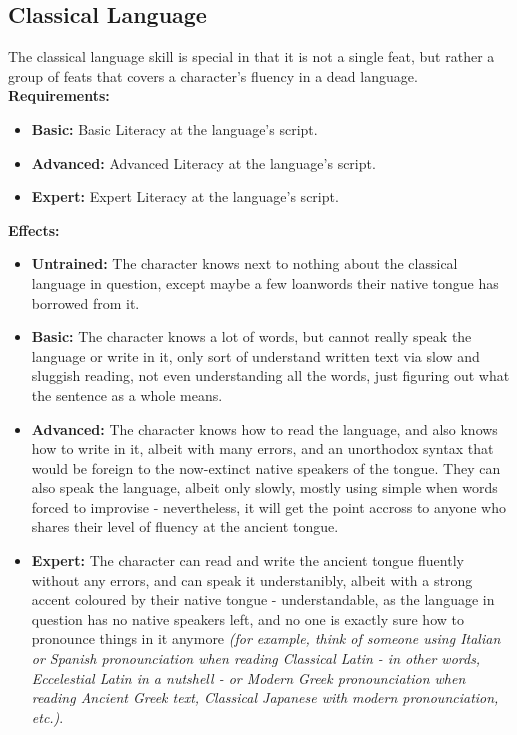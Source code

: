 \documentclass[openany,10pt,a4paper]{book}
\begin{document}
\subsection{Classical Language}
The classical language skill is special in that it is not a single feat, but rather a group of feats that covers a character's fluency in a dead language.\newline
\textbf{Requirements:}
\begin{itemize}
	\item \textbf{Basic:} Basic Literacy at the language's script.
	\item \textbf{Advanced:} Advanced Literacy at the language's script.
	\item \textbf{Expert:} Expert Literacy at the language's script.
\end{itemize}
\textbf{Effects:}
\begin{itemize}
	\item \textbf{Untrained:} The character knows next to nothing about the classical language in question, except maybe a few loanwords their native tongue has borrowed from it.
	\item \textbf{Basic:} The character knows a lot of words, but cannot really speak the language or write in it, only sort of understand written text via slow and sluggish reading, not even understanding all the words, just figuring out what the sentence as a whole means.
	\item \textbf{Advanced:} The character knows how to read the language, and also knows how to write in it, albeit with many errors, and an unorthodox syntax that would be foreign to the now-extinct native speakers of the tongue. They can also speak the language, albeit only slowly, mostly using simple when words forced to improvise - nevertheless, it will get the point accross to anyone who shares their level of fluency at the ancient tongue.
	\item \textbf{Expert:} The character can read and write the ancient tongue fluently without any errors, and can speak it understanibly, albeit with a strong accent coloured by their native tongue - understandable, as the language in question has no native speakers left, and no one is exactly sure how to pronounce things in it anymore \textit{(for example, think of someone using Italian or Spanish pronounciation when reading Classical Latin - in other words, Eccelestial Latin in a nutshell - or Modern Greek pronounciation when reading Ancient Greek text, Classical Japanese with modern pronounciation, etc.)}.
\end{itemize}\newpage
\end{document}
